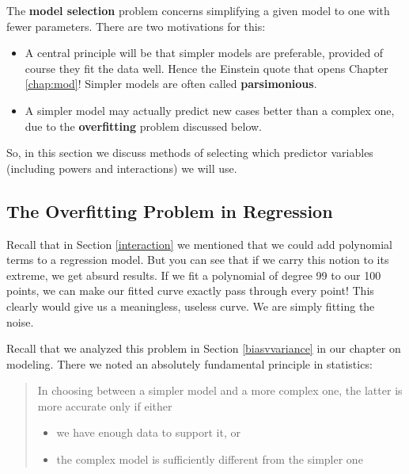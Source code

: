 The {\bf model selection} problem concerns simplifying a given model to
one with fewer parameters.  There are two motivations for this:

\begin{itemize}

\item A central principle will be that simpler models are preferable,
provided of course they fit the data well.  Hence the Einstein quote
that opens Chapter \ref{chap:mod}!  Simpler models are often called {\bf
parsimonious}.

\item A simpler model may actually predict new cases better than a
complex one, due to the {\bf overfitting} problem discussed below.

\end{itemize}

So, in this section we discuss methods of selecting which predictor
variables (including powers and interactions) we will use.  

\subsection{The Overfitting Problem in Regression}
\label{overfit}

Recall that in Section \ref{interaction} we mentioned that we could add
polynomial terms to a regression model.  But you can see that if we
carry this notion to its extreme, we get absurd results.  If we fit a
polynomial of degree 99 to our 100 points, we can make our fitted curve
exactly pass through every point!  This clearly would give us a
meaningless, useless curve.  We are simply fitting the noise.

Recall that we analyzed this problem in Section \ref{biasvvariance} in
our chapter on modeling.  There we noted an absolutely fundamental
principle in statistics:

\begin{quote}
In choosing between a simpler model and a more complex one,
the latter is more accurate only if either

\begin{itemize}

\item we have enough data to support it, or

\item the complex model is sufficiently different from the simpler one

\end{itemize}

\end{quote}

